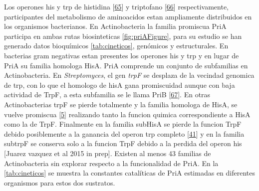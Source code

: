 \documentclass[12pt,twoside]{reedthesis}
\begin{document}
  Los operones his y trp de histidina
  {[}\protect\hyperlink{ref-fondi_evolution_2009}{65}{]} y triptofano
  {[}\protect\hyperlink{ref-merino_evolution_2008}{66}{]} respectivamente,
  participantes del metabolismo de aminoacidos estan ampliamente
  distribuidos en los organismos bacterianos. En Actinobacteria la familia
  promiscua PriA participa en ambas rutas biosinteticas
  \autoref{fig:priAFigure}, para su estudio se han generado datos
  bioquímicos \autoref{tab:cineticos}, genómicos y estructurales. En
  bacterias gram negativas estan presentes los operones his y trp y en
  lugar de PriA su familia homologa HisA. PriA comprende un conjunto de
  subfamilias en Actinobacteria. En \emph{Streptomyces}, el gen
  \emph{trpF} se desplaza de la vecindad genomica de trp, con lo que el
  homologo de hisA gana promiscuidad aunque con baja actividad de TrpF, a
  esta subfamilia se le llama PriB
  {[}\protect\hyperlink{ref-verduzco-castro_co-occurrence_2016}{67}{]}. En
  otras Actinobacterias trpF se pierde totalmente y la familia homologa de
  HisA, se vuelve promiscua
  {[}\protect\hyperlink{ref-baronagomez_occurrence_2003}{5}{]} realizando
  tanto la funcion quimica correspondiente a HisA como la de TrpF.
  Finalmente en la familia subHisA se pierde la funcion TrpF debido
  posiblemente a la ganancia del operon trp completo
  {[}\protect\hyperlink{ref-noda-garcia_evolution_2013}{41}{]} y en la
  familia subtrpF se conserva solo a la funcion TrpF debido a la perdida
  del operon his {[}Juarez vazquez et al 2015 in prep{]}. Existen al menos
  43 familias de Actinobacteria sin explorar respecto a la funcionalidad
  de PriA. En la \autoref{tab:cineticos} se muestra la constantes
  catalíticas de PriA estimadas en diferentes organismos para estos dos
  sustratos.
  
  \clearpage    
  
\end{document}
